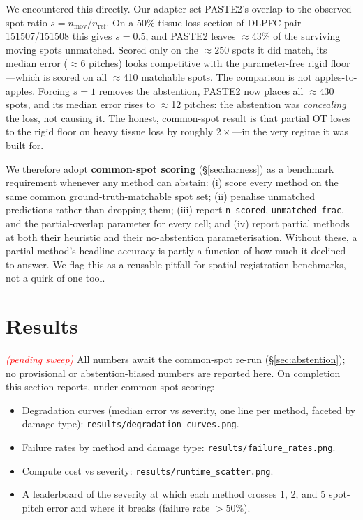 \documentclass[11pt]{article}
\newcommand{\pending}{\textcolor{red}{\emph{(pending sweep)}}}
\begin{document}
We encountered this directly. Our adapter set PASTE2's overlap to the observed
spot ratio $s=n_\text{mov}/n_\text{ref}$. On a 50\%-tissue-loss section of DLPFC
pair 151507/151508 this gives $s=0.5$, and PASTE2 leaves $\approx$43\% of the
surviving moving spots unmatched. Scored only on the $\approx$250 spots it did
match, its median error ($\approx$6 pitches) looks competitive with the
parameter-free rigid floor---which is scored on all $\approx$410 matchable spots.
The comparison is not apples-to-apples. Forcing $s{=}1$ removes the abstention,
PASTE2 now places all $\approx$430 spots, and its median error rises to
$\approx$12 pitches: the abstention was \emph{concealing} the loss, not causing
it. The honest, common-spot result is that partial OT loses to the rigid floor
on heavy tissue loss by roughly $2\times$---in the very regime it was built for.

We therefore adopt \textbf{common-spot scoring} (\S\ref{sec:harness}) as a
benchmark requirement whenever any method can abstain: (i) score every method on
the same common ground-truth-matchable spot set; (ii) penalise unmatched
predictions rather than dropping them; (iii) report \texttt{n\_scored},
\texttt{unmatched\_frac}, and the partial-overlap parameter for every cell; and
(iv) report partial methods at both their heuristic and their no-abstention
parameterisation. Without these, a partial method's headline accuracy is partly a
function of how much it declined to answer. We flag this as a reusable pitfall for
spatial-registration benchmarks, not a quirk of one tool.

\section{Results}
\label{sec:results}
\pending{} All numbers await the common-spot re-run (\S\ref{sec:abstention}); no
provisional or abstention-biased numbers are reported here. On completion this
section reports, under common-spot scoring:
\begin{itemize}
  \item Degradation curves (median error vs severity, one line per method,
  faceted by damage type): \texttt{results/degradation\_curves.png}.
  \item Failure rates by method and damage type:
  \texttt{results/failure\_rates.png}.
  \item Compute cost vs severity: \texttt{results/runtime\_scatter.png}.
  \item A leaderboard of the severity at which each method crosses 1, 2, and 5
  spot-pitch error and where it breaks (failure rate $>50\%$).
\end{itemize}
\end{document}

